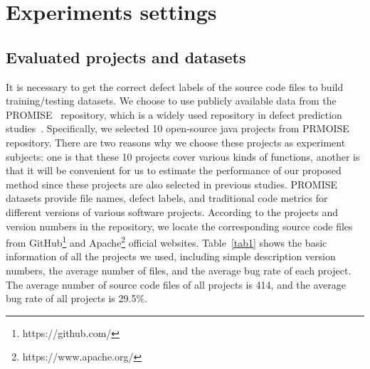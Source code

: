 \documentclass[journal]{IEEEtran}
\begin{document}
\section{Experiments settings}
\subsection{Evaluated projects and datasets}
It is necessary to get the correct defect labels of the source code files to build training/testing datasets. We choose to use publicly available data from the PROMISE~\cite{he2013learning} repository, which is a widely used repository in defect prediction studies~\cite{wang2018deep,fan2019deep,li2017software,he2013learning,jing2014dictionary,chen2020different}. Specifically, we selected 10 open-source java projects from PRMOISE repository. There are two reasons why we choose these projects as experiment subjects: one is that these 10 projects cover various kinds of functions, another is that it will be convenient for us to  estimate the performance of our proposed method since these projects are also selected in previous studies. PROMISE datasets provide file names, defect labels, and traditional code metrics for different versions of various software projects. According to the projects and version numbers in the repository, we locate the corresponding source code files from GitHub\footnote{https://github.com/} and Apache\footnote{https://www.apache.org/} official websites. Table~\ref{tab1} shows the basic information of all the projects we used, including simple description version numbers, the average number of files, and the average bug rate of each project. The average number of source code files of all projects is 414, and the average bug rate of all projects is 29.5\%.
\end{document}
